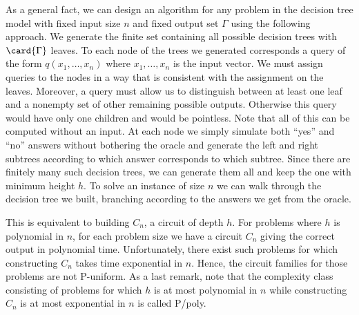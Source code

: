 As a general fact, we can design an algorithm for any problem in the decision
tree model with fixed input size \(n\) and fixed output set \(\Gamma\) using
the following approach. We generate the finite set containing all possible
decision trees with \(\card{\Gamma}\) leaves. To each node of the trees we
generated corresponds a query of the form \(q(x_1,\ldots,x_n)\) where
\(x_1,\ldots,x_n\) is the input vector. We must assign queries to the nodes
in a way that is consistent with the assignment on the leaves. Moreover, a
query must allow us to distinguish between at least one leaf and a nonempty
set of other remaining possible outputs. Otherwise this query would have only
one children and would be pointless. Note that all of this can be computed
without an input. At each node we simply simulate both ``yes'' and ``no''
answers without bothering the oracle and generate the left and right subtrees
according to which answer corresponds to which subtree. Since there are
finitely many such decision trees, we can generate them all and keep the one
with minimum height \(h\). To solve an instance of size \(n\) we can walk
through the decision tree we built, branching according to the answers we get
from the oracle.

This is equivalent to building \(C_n\), a circuit of depth \(h\). For problems
where \(h\) is polynomial in \(n\), for each problem size we have a circuit
\(C_n\) giving the correct output in polynomial time. Unfortunately, there
exist such problems for which constructing \(C_n\) takes time exponential
in \(n\). Hence, the circuit families for those problems are not P-uniform. As
a last remark, note that the complexity class consisting of problems for which
\(h\) is at most polynomial in \(n\) while constructing \(C_n\) is at most
exponential in \(n\) is called P/poly.

